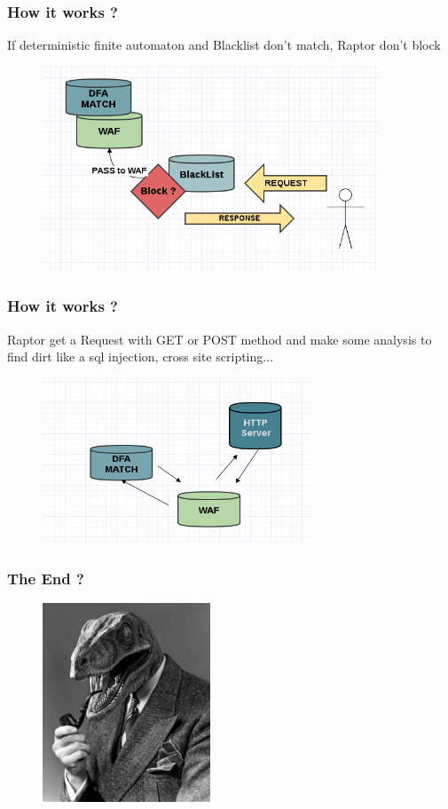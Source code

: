 \documentclass[serif,mathserif]{beamer}
\begin{document}
\begin{frame}
  \frametitle{How it works ?}
  If deterministic finite automaton and Blacklist don't match, Raptor don't block 
  \begin{itemize} 
  \begin{figure}[]    
    \centering
    \includegraphics[width=10cm]{images/pass.png} 
  \end{figure}
  \end{itemize}
\end{frame}

\begin{frame}
  \frametitle{How it works ?}
  Raptor get a Request with GET or POST method and make some analysis to find dirt like a sql injection, cross site scripting...
  \begin{itemize} 
  \begin{figure}[]    
    \centering
    \includegraphics[width=8cm]{images/http.png} 
  \end{figure}
  \end{itemize}
\end{frame}


\begin{frame}
  \frametitle{The End ?}
  \begin{figure}[]    
    \centering
    \includegraphics[width=5cm]{images/raptor0.jpg} 
  \end{figure}
\end{frame}
\end{document}
